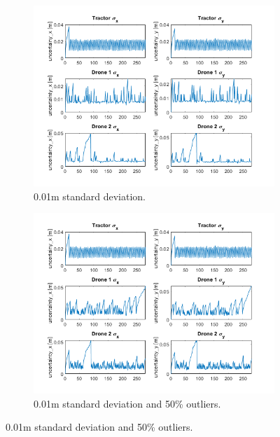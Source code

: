 \documentclass[letterpaper,twocolumn,10pt]{article}
\begin{document}
\begin{figure}[!h]
     \centering
     \begin{subfigure}[b]{0.40\textwidth}
         \centering
         \includegraphics[width=\textwidth]{images/1.png}
         \caption{0.01m standard deviation.}
         \label{fig:8a}
     \end{subfigure}
     \hfill
     \begin{subfigure}[b]{0.40\textwidth}
         \centering
         \includegraphics[width=\textwidth]{images/2.png}
         \caption{0.01m standard deviation and 50\% outliers.}
         \label{fig:8b}
     \end{subfigure}


\end{figure}
\end{document}
